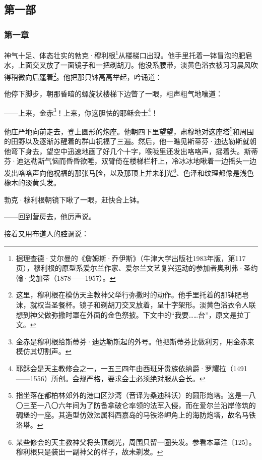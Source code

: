 \subsection*{第一部}






\subsubsection*{第一章}

\par 神气十足、体态壮实的勃克·穆利根\footnote{据理查德·艾尔曼的《詹姆斯·乔伊斯》（牛津大学出版社1983年版，第117页），穆利根的原型系爱尔兰作家、爱尔兰文艺复兴运动的参加者奥利弗·圣约翰·戈加蒂（1878——1957）。}从楼梯口出现。他手里托着一钵冒泡的肥皂水，上面交叉放了一面镜子和一把剃胡刀。他没系腰带，淡黄色浴衣被习习晨风吹得稍微向后蓬着\footnote{这里，穆利根在模仿天主教神父举行弥撒时的动作。他手里托着的那钵肥皂沫，就权当圣餐杯。镜子和剃胡刀交叉放着，呈十字架形。淡黄色浴衣令人联想到神父做弥撒时罩在外面的金色祭披。下文中的“我要……台”，原文是拉丁文。}。他把那只钵高高举起，吟诵道：
\par 他停下脚步，朝那昏暗的螺旋状楼梯下边瞥了一眼，粗声粗气地嚷道：
\par ——上来，金赤\footnote{金赤是穆利根给斯蒂芬·迪达勒斯起的外号。他把斯蒂芬比做利刃，用金赤来模仿其切割声。}！上来，你这胆怯的耶稣会士\footnote{耶稣会是天主教修会之一，一五三四年由西班牙贵族依纳爵·罗耀拉（1491——1556）所创。会规严格，要求会士必须绝对服从会长。}！
\par 他庄严地向前走去，登上圆形的炮座。他朝四下里望望，肃穆地对这座塔\footnote{指坐落在都柏林郊外的港口区沙湾（音译为桑迪科沃）的圆形炮塔。这是一八〇三至一八〇六年间为了防备拿破仑率领的法军入侵，而在爱尔兰沿岸修筑的碉堡的一座。其造型仿效法属科西嘉岛的马铁洛岬角上的海防炮塔，故名马铁洛塔。}和周围的田野以及逐渐苏醒着的群山祝福了三遍。然后，他一瞧见斯蒂芬·迪达勒斯就朝他弯下身去，望空中迅速地画了好几个十字，喉咙里还发出咯咯声，摇着头。斯蒂芬·迪达勒斯气恼而昏昏欲睡，双臂倚在楼梯栏杆上，冷冰冰地瞅着一边摇头一边发出咯咯声向他祝福的那张马脸，以及那顶上并未剃光\footnote{某些修会的天主教神父将头顶剃光，周围只留一圈头发。参看本章注〔125〕。穆利根只是装出一副神父的样子，故未剃发。}、色泽和纹理都像是浅色橡木的淡黄头发。
\par 勃克·穆利根朝镜下瞅了一眼，赶快合上钵。
\par ——回到营房去，他厉声说。
\par 接着又用布道人的腔调说：
